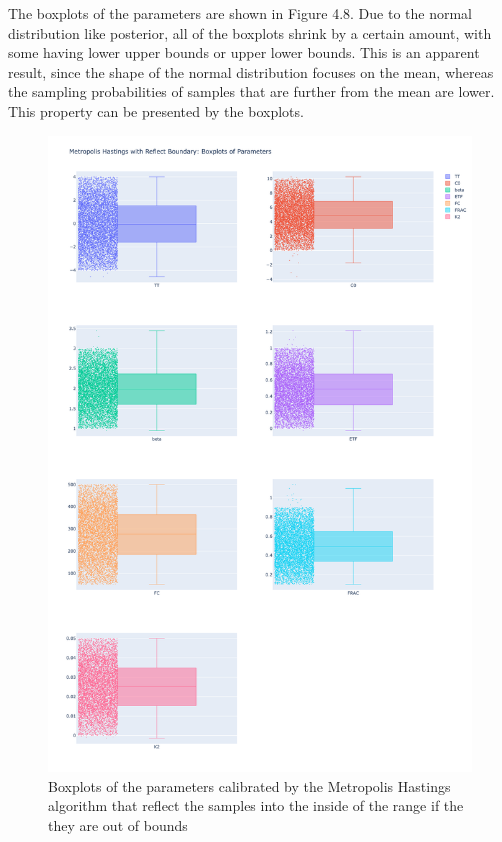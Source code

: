 The boxplots of the parameters are shown in Figure 4.8. Due to the normal distribution like posterior, all of the boxplots shrink by a certain amount, with some having lower upper bounds or upper lower bounds. This is an apparent result, since the shape of the normal distribution focuses on the mean, whereas the sampling probabilities of samples that are further from the mean are lower. This property can be presented by the boxplots.

\begin{figure}
    \centering
    \includegraphics[width=1\textwidth]{figures/basic_mh/rb_mh/rb_mh_boxplot.png}
    \captionsetup{width=.8\textwidth}
    \caption{Boxplots of the parameters calibrated by the Metropolis Hastings algorithm that reflect the samples into the inside of the range if the they are out of bounds}
    \label{fig:enter-label}
\end{figure}



